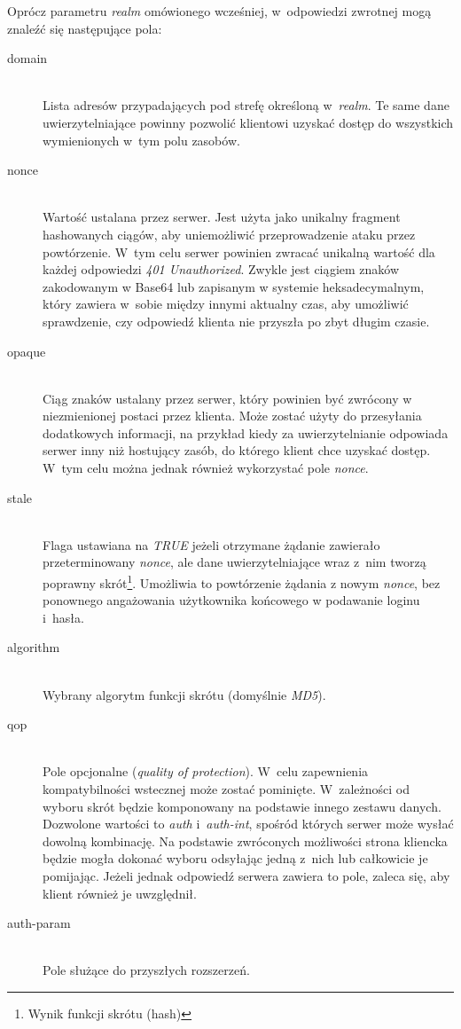 \documentclass[11pt]{aghdpl}
\begin{document}
Oprócz parametru \emph{realm} omówionego wcześniej, w~odpowiedzi zwrotnej mogą znaleźć się następujące pola:
\begin{description}
\item[domain] \hfill \\
Lista adresów przypadających pod strefę określoną w~\emph{realm}. Te same dane uwierzytelniające powinny pozwolić klientowi uzyskać dostęp do wszystkich wymienionych w~tym polu zasobów.
\item[nonce] \hfill \\

Wartość ustalana przez serwer. Jest użyta jako unikalny fragment hashowanych ciągów, aby uniemożliwić przeprowadzenie ataku przez powtórzenie. W~tym celu serwer powinien zwracać unikalną wartość dla każdej odpowiedzi \emph{401 Unauthorized}. Zwykle jest ciągiem znaków zakodowanym w Base64 lub zapisanym w systemie heksadecymalnym, który zawiera w~sobie między innymi aktualny czas, aby umożliwić sprawdzenie, czy odpowiedź klienta nie przyszła po zbyt długim czasie.
\item[opaque] \hfill \\
Ciąg znaków ustalany przez serwer, który powinien być zwrócony w niezmienionej postaci przez klienta. Może zostać użyty do przesyłania dodatkowych informacji, na przykład kiedy za uwierzytelnianie odpowiada serwer inny niż hostujący zasób, do którego klient chce uzyskać dostęp. W~tym celu można jednak również wykorzystać pole \emph{nonce}.
\item[stale] \hfill \\
Flaga ustawiana na \emph{TRUE} jeżeli otrzymane żądanie zawierało przeterminowany \emph{nonce}, ale dane uwierzytelniające wraz z~nim tworzą poprawny skrót\footnote{Wynik funkcji skrótu (hash)}. Umożliwia to powtórzenie żądania z nowym \emph{nonce}, bez ponownego angażowania użytkownika końcowego w podawanie loginu i~hasła.
\item[algorithm] 
\hfill \\Wybrany algorytm funkcji skrótu (domyślnie \emph{MD5}).
\item[qop] \hfill \\
Pole opcjonalne (\emph{quality of protection}). W~celu zapewnienia kompatybilności wstecznej może zostać pominięte. W~zależności od wyboru skrót będzie komponowany na podstawie innego zestawu danych. Dozwolone wartości to \emph{auth} i~\emph{auth-int}, spośród których serwer może wysłać dowolną kombinację. Na podstawie zwróconych możliwości strona kliencka będzie mogła dokonać wyboru odsyłając jedną z~nich lub całkowicie je pomijając. Jeżeli jednak odpowiedź serwera zawiera to pole, zaleca się, aby klient również je uwzględnił.
\item[auth-param] \hfill \\
Pole służące do przyszłych rozszerzeń.
\end{description}
\end{document}
